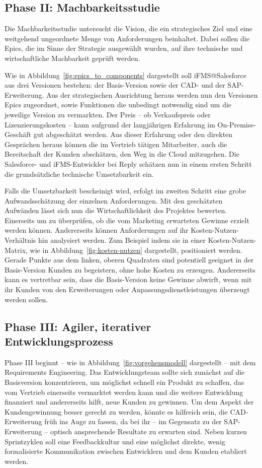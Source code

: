 \subsection{Phase II: Machbarkeitsstudie}
Die Machbarkeitsstudie untersucht die Vision, die ein strategisches Ziel und 
eine weitgehend ungeordnete Menge von Anforderungen beinhaltet. Dabei sollen 
die Epics, die im Sinne der Strategie ausgewählt wurden, auf ihre technische 
und wirtschaftliche Machbarkeit geprüft werden.

Wie in Abbildung~\ref{fig:epics_to_components} dargestellt soll iFMS@Salesforce 
aus drei Versionen bestehen: der Basis-Version sowie der CAD- und der 
SAP-Erweiterung. Aus der strategischen Ausrichtung heraus werden nun den 
Versionen Epics zugeordnet, sowie Funktionen die unbedingt notwendig sind um die 
jeweilige Version zu vermarkten. Der Preis -- ob Verkaufspreis oder 
Lizenzierungskosten -- kann aufgrund der langjährigen Erfahrung im 
On-Premise-Geschäft gut abgeschätzt werden. Aus dieser Erfahrung oder den direkten 
Gesprächen heraus können die im Vertrieb tätigen Mitarbeiter, auch die 
Bereitschaft der Kunden abschätzen, den Weg in die Cloud mitzugehen. Die 
Salesforce- und iFMS-Entwickler bei Reply schätzen nun in einem ersten Schritt 
die grundsätzliche technische Umsetzbarkeit ein.

Falls die Umsetzbarkeit bescheinigt wird, erfolgt im zweiten Schritt eine grobe 
Aufwandsschätzung der einzelnen Anforderungen. Mit den geschätzten Aufwänden 
lässt sich nun die Wirtschaftlichkeit des Projektes bewerten. Einerseits um zu 
überprüfen, ob die vom Marketing erwarteten Gewinne erzielt werden können. 
Andererseits können Anforderungen auf ihr Kosten-Nutzen-Verhältnis hin 
analysiert werden. Zum Beispiel indem sie in einer Kosten-Nutzen-Matrix, wie in 
Abbildung~\ref{fig:kosten-nutzen} dargestellt, positioniert werden. Gerade Punkte aus dem 
linken, oberen Quadraten sind potentiell geeignet in der Basis-Version Kunden zu 
begeistern, ohne hohe Kosten zu erzeugen.
Andererseits kann es vertretbar sein, dass die Basis-Version keine Gewinne 
abwirft, wenn mit ihr Kunden von den Erweiterungen oder 
Anpassungsdienstleistungen überzeugt werden sollen.

\subsection{Phase III: Agiler, iterativer Entwicklungsprozess}
Phase III beginnt -- wie in Abbildung~\ref{fig:vorgehensmodell} dargestellt -- 
mit dem Requirements Engineering. Das Entwicklungsteam sollte sich zunächst auf 
die Basisversion konzentrieren, um möglichst schnell ein Produkt zu schaffen, 
das vom Vertrieb einerseits vermarktet werden kann und die weitere 
Entwicklung finanziert und andererseits hilft, neue Kunden zu gewinnen. Um dem 
Aspekt der Kundengewinnung besser gerecht zu werden, könnte es hilfreich sein, 
die CAD-Erweiterung früh ins Auge zu fassen, da bei ihr -- im Gegensatz zu der 
SAP-Erweiterung -- optisch ansprechende Resultate zu erwarten sind. 
Neben kurzen Sprintzyklen soll eine Feedbackkultur und eine möglichst direkte, 
wenig formalisierte Kommunikation zwischen Entwicklern und dem 
Kunden etabliert werden.